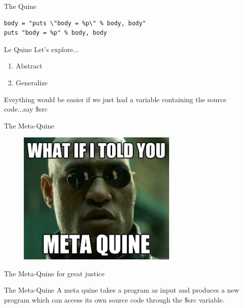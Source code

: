 \documentclass[pdf,14pt]{beamer}
\begin{document}
\begin{frame}[fragile]{The Quine}
\begin{verbatim}
body = "puts \"body = %p\" % body, body"
puts "body = %p" % body, body
\end{verbatim}
\end{frame}

\begin{frame}{Le Quine}
  Let's explore...
  \pause
  \begin{enumerate}
  \item Abstract
    \pause
  \item Generalize
  \end{enumerate}
\end{frame}

\begin{frame}
  Eveything would be easier if we just had a variable
  containing the source code...\pause\;say \$src
\end{frame}

\begin{frame}{The Meta-Quine}
  \begin{figure}[ht]
    \begin{center}
      \includegraphics[height=6.5cm]{morpheus.jpeg}
    \end{center}
  \end{figure}  
\end{frame}

\begin{frame}[fragile]{The Meta-Quine for great justice}

\end{frame}

\begin{frame}{The Meta-Quine}
  A meta quine takes a program as input and produces a new
  program which can access its own source code through the \$src
  variable.
\end{frame}
\end{document}
